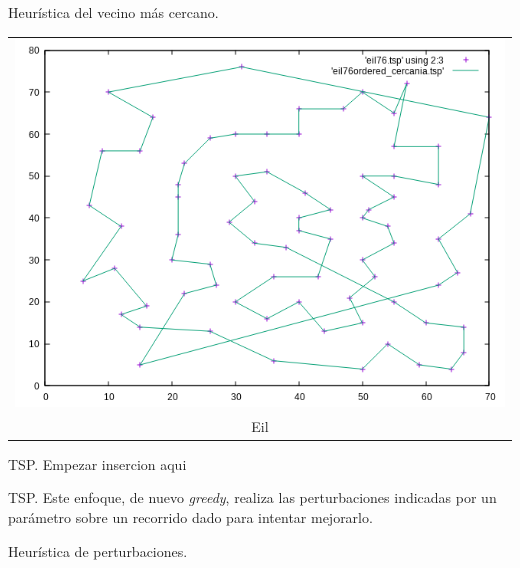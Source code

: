 \documentclass[10pt, xcolor=table]{beamer}
\begin{document}
\begin{frame}[fragile]{Heurística del vecino más cercano. }
\begin{center}
\begin{tabular}{c}
\includegraphics[scale=0.23]{./Images/eil_cercania.png} \\
Eil
\end{tabular}
\end{center}
\end{frame}

\begin{frame}[fragile]{TSP. }
Empezar insercion aqui
\end{frame}

\begin{frame}[fragile]{TSP. }
Este enfoque, de nuevo \textit{greedy}, realiza las perturbaciones indicadas por un parámetro sobre un recorrido dado para intentar mejorarlo. 
\end{frame}

\begin{frame}[fragile]{Heurística de perturbaciones. }
\begin{center}
\scalebox{0.7}{

}
\end{center}
\end{frame}
\end{document}
